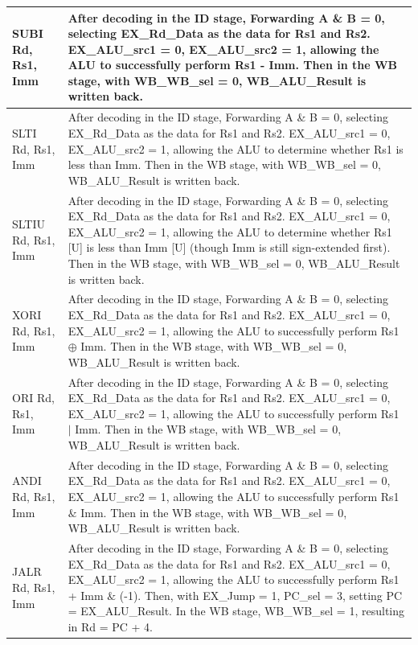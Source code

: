 \documentclass[12pt,a4paper]{report}
\begin{document}
\begin{longtable}{|l|p{12cm}|}
SUBI Rd, Rs1, Imm & After decoding in the ID stage, Forwarding A \& B = 0, selecting EX\_Rd\_Data as the data for Rs1 and Rs2. EX\_ALU\_src1 = 0, EX\_ALU\_src2 = 1, allowing the ALU to successfully perform Rs1 - Imm. Then in the WB stage, with WB\_WB\_sel = 0, WB\_ALU\_Result is written back. \\
\hline

SLTI Rd, Rs1, Imm & After decoding in the ID stage, Forwarding A \& B = 0, selecting EX\_Rd\_Data as the data for Rs1 and Rs2. EX\_ALU\_src1 = 0, EX\_ALU\_src2 = 1, allowing the ALU to determine whether Rs1 is less than Imm. Then in the WB stage, with WB\_WB\_sel = 0, WB\_ALU\_Result is written back. \\
\hline

SLTIU Rd, Rs1, Imm & After decoding in the ID stage, Forwarding A \& B = 0, selecting EX\_Rd\_Data as the data for Rs1 and Rs2. EX\_ALU\_src1 = 0, EX\_ALU\_src2 = 1, allowing the ALU to determine whether Rs1 [U] is less than Imm [U] (though Imm is still sign-extended first). Then in the WB stage, with WB\_WB\_sel = 0, WB\_ALU\_Result is written back. \\
\hline

XORI Rd, Rs1, Imm & After decoding in the ID stage, Forwarding A \& B = 0, selecting EX\_Rd\_Data as the data for Rs1 and Rs2. EX\_ALU\_src1 = 0, EX\_ALU\_src2 = 1, allowing the ALU to successfully perform Rs1 $\oplus$ Imm. Then in the WB stage, with WB\_WB\_sel = 0, WB\_ALU\_Result is written back. \\
\hline

ORI Rd, Rs1, Imm & After decoding in the ID stage, Forwarding A \& B = 0, selecting EX\_Rd\_Data as the data for Rs1 and Rs2. EX\_ALU\_src1 = 0, EX\_ALU\_src2 = 1, allowing the ALU to successfully perform Rs1 $|$ Imm. Then in the WB stage, with WB\_WB\_sel = 0, WB\_ALU\_Result is written back. \\
\hline

ANDI Rd, Rs1, Imm & After decoding in the ID stage, Forwarding A \& B = 0, selecting EX\_Rd\_Data as the data for Rs1 and Rs2. EX\_ALU\_src1 = 0, EX\_ALU\_src2 = 1, allowing the ALU to successfully perform Rs1 $\&$ Imm. Then in the WB stage, with WB\_WB\_sel = 0, WB\_ALU\_Result is written back. \\
\hline

JALR Rd, Rs1, Imm & After decoding in the ID stage, Forwarding A \& B = 0, selecting EX\_Rd\_Data as the data for Rs1 and Rs2. EX\_ALU\_src1 = 0, EX\_ALU\_src2 = 1, allowing the ALU to successfully perform Rs1 + Imm $\&$ (-1). Then, with EX\_Jump = 1, PC\_sel = 3, setting PC = EX\_ALU\_Result. In the WB stage, WB\_WB\_sel = 1, resulting in Rd = PC + 4. \\
\hline


\end{longtable}
\end{document}
